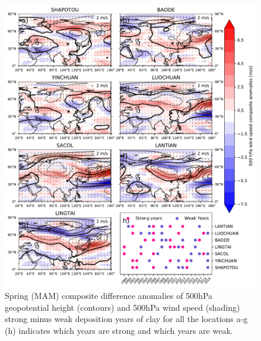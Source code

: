 \begin{figure}[hptb]
    \centering
    \includegraphics[width=\columnwidth]{texfiles/figs/geopot_ws_500hPa_2micron_MAM.pdf}
    \caption{Spring (MAM) composite difference anomalies of 500hPa geopotential height (contours) and 500hPa wind speed (shading) strong minus weak deposition years of clay for all the locations a-g  (h) indicates which years are strong and which years are weak.}
    \label{fig:MAM_500hPa_fine_composite}
\end{figure}

